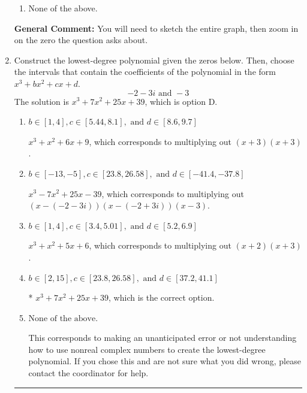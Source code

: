 \documentclass{extbook}[14pt]
\newcommand{\litem}[1]{\item #1

\rule{\textwidth}{0.4pt}}
\begin{document}
\begin{enumerate}
{\begin{enumerate}[label=\Alph*.]
\item None of the above.\end{enumerate}
\textbf{General Comment:} You will need to sketch the entire graph, then zoom in on the zero the question asks about.
}
\litem{
Construct the lowest-degree polynomial given the zeros below. Then, choose the intervals that contain the coefficients of the polynomial in the form $x^3+bx^2+cx+d$.
\[ -2 - 3 i \text{ and } -3 \]The solution is \( x^{3} +7 x^{2} +25 x + 39 \), which is option D.\begin{enumerate}[label=\Alph*.]
\item \( b \in [1, 4], c \in [5.44, 8.1], \text{ and } d \in [8.6, 9.7] \)

$x^{3} + x^{2} +6 x + 9$, which corresponds to multiplying out $(x + 3)(x + 3)$.
\item \( b \in [-13, -5], c \in [23.8, 26.58], \text{ and } d \in [-41.4, -37.8] \)

$x^{3} -7 x^{2} +25 x -39$, which corresponds to multiplying out $(x-(-2 - 3 i))(x-(-2 + 3 i))(x -3)$.
\item \( b \in [1, 4], c \in [3.4, 5.01], \text{ and } d \in [5.2, 6.9] \)

$x^{3} + x^{2} +5 x + 6$, which corresponds to multiplying out $(x + 2)(x + 3)$.
\item \( b \in [2, 15], c \in [23.8, 26.58], \text{ and } d \in [37.2, 41.1] \)

* $x^{3} +7 x^{2} +25 x + 39$, which is the correct option.
\item \( \text{None of the above.} \)

This corresponds to making an unanticipated error or not understanding how to use nonreal complex numbers to create the lowest-degree polynomial. If you chose this and are not sure what you did wrong, please contact the coordinator for help.
\end{enumerate}

}
\end{enumerate}
\end{document}
